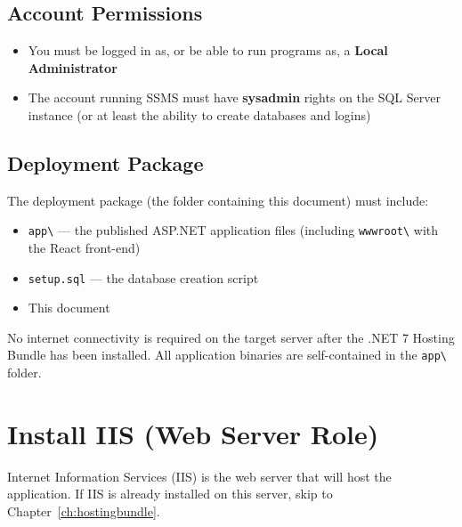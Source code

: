 \documentclass[12pt,a4paper]{report}
\begin{document}
\section{Account Permissions}
\begin{itemize}
  \item You must be logged in as, or be able to run programs as, a \textbf{Local Administrator}
  \item The account running SSMS must have \textbf{sysadmin} rights on the SQL Server instance (or at least the ability to create databases and logins)
\end{itemize}

\section{Deployment Package}
The deployment package (the folder containing this document) must include:
\begin{itemize}
  \item \texttt{app\textbackslash} --- the published ASP.NET application files (including \texttt{wwwroot\textbackslash} with the React front-end)
  \item \texttt{setup.sql} --- the database creation script
  \item This document
\end{itemize}

\begin{notebox}
No internet connectivity is required on the target server after the .NET 7 Hosting Bundle has been installed. All application binaries are self-contained in the \texttt{app\textbackslash} folder.
\end{notebox}

\chapter{Install IIS (Web Server Role)}

Internet Information Services (IIS) is the web server that will host the application. If IIS is already installed on this server, skip to Chapter~\ref{ch:hostingbundle}.
\end{document}
